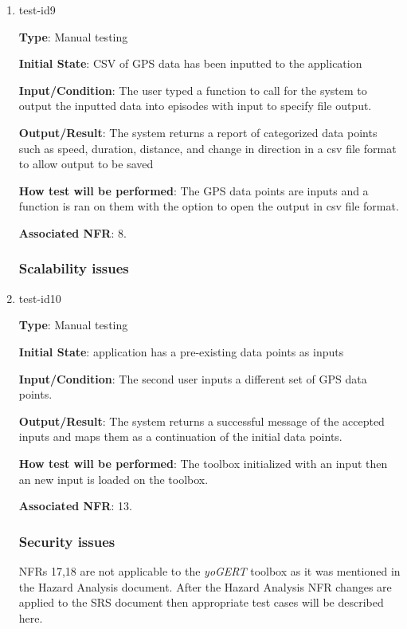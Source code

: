 \documentclass[12pt, titlepage]{article}
\begin{document}
\begin{enumerate}
\item{test-id9\\}

\textbf{Type}: Manual testing
					
\textbf{Initial State}: CSV of GPS data has been inputted to the application
					
\textbf{Input/Condition}: The user typed a function to call for the system to output the
inputted data into episodes with input to specify file output. 
					
\textbf{Output/Result}: The system returns a report of categorized data points such
as speed, duration, distance, and change in direction in a csv file format to allow output to be saved
					
\textbf{How test will be performed}: The GPS data points are inputs and a function is ran on them with the option to open the output in csv file format.

\textbf{Associated NFR}: 8.

\subsubsection{Scalability issues}

\item{test-id10\\}

\textbf{Type}: Manual testing
					
\textbf{Initial State}: application has a pre-existing data points as inputs
					
\textbf{Input/Condition}: The second user inputs a different set of GPS data points.
					
\textbf{Output/Result}: The system returns a successful message of the accepted inputs and maps them as a continuation of the initial data points. 
					
\textbf{How test will be performed}: The toolbox initialized with an input then an new input is loaded on the toolbox. 

\textbf{Associated NFR}: 13.

\subsubsection{Security issues}
NFRs 17,18  are not applicable to the \emph{yoGERT} toolbox as it was mentioned in the Hazard Analysis document. After the Hazard Analysis NFR changes are applied to the SRS document then appropriate test cases will be described here.

\end{enumerate}
\end{document}
